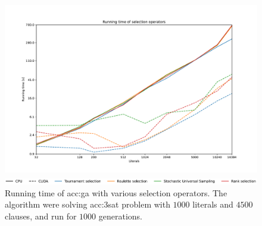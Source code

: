 
\begin{figure}[ht!]
    \centering
    \begin{minipage}[t]{0.9\textwidth}
        \includegraphics[width=\textwidth]{img/runs/time_ga_selections.pdf}
    \end{minipage}

    \begin{minipage}[t]{0.9\textwidth}
        \includegraphics[width=\textwidth]{img/runs/time_ga_selections_legend.pdf}
    \end{minipage}

    \caption[Running time of selection operators]{Running time of \acrlong{acc:ga} with various selection operators. The algorithm were solving \acrshort{acc:3sat} problem with $1000$ literals and $4500$ clauses, and run for $1000$ generations.}
    \label{meas:selection}
\end{figure}





